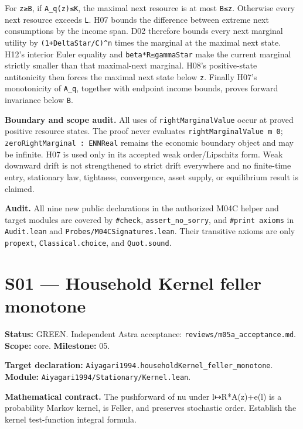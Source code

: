 \documentclass[
  11pt,
]{article}
\let\LedgerOriginalTexttt\texttt
\renewcommand{\texttt}[1]{{\small\LedgerOriginalTexttt{#1}}}
\begin{document}
For \texttt{z≥B}, if \texttt{A\_q(z)≤K}, the maximal next resource is at
most \texttt{B≤z}. Otherwise every next resource exceeds \texttt{L}. H07
bounds the difference between extreme next consumptions by the income
span. D02 therefore bounds every next marginal utility by
\texttt{(1+DeltaStar/C)\^{}n} times the marginal at the maximal next
state. H12's interior Euler equality and \texttt{beta*R≤gammaStar} make
the current marginal strictly smaller than that maximal-next marginal.
H08's positive-state antitonicity then forces the maximal next state
below \texttt{z}. Finally H07's monotonicity of \texttt{A\_q}, together
with endpoint income bounds, proves forward invariance below \texttt{B}.

\textbf{Boundary and scope audit.} All uses of
\texttt{rightMarginalValue} occur at proved positive resource states.
The proof never evaluates \texttt{rightMarginalValue\ m\ 0};
\texttt{zeroRightMarginal\ :\ ENNReal} remains the economic boundary
object and may be infinite. H07 is used only in its accepted weak
order/Lipschitz form. Weak downward drift is not strengthened to strict
drift everywhere and no finite-time entry, stationary law, tightness,
convergence, asset supply, or equilibrium result is claimed.

\textbf{Audit.} All nine new public declarations in the authorized M04C
helper and target modules are covered by \texttt{\#check},
\texttt{assert\_no\_sorry}, and \texttt{\#print\ axioms} in
\texttt{Audit.lean} and \texttt{Probes/M04CSignatures.lean}. Their
transitive axioms are only \texttt{propext}, \texttt{Classical.choice},
and \texttt{Quot.sound}.

\section{S01 --- Household Kernel feller
monotone}\label{s01-household-kernel-feller-monotone}

\textbf{Status:} GREEN. Independent Astra acceptance:
\texttt{reviews/m05a\_acceptance.md}. \textbf{Scope:} core.
\textbf{Milestone:} 05.

\textbf{Target declaration:}
\texttt{Aiyagari1994.householdKernel\_feller\_monotone}.\\
\textbf{Module:} \texttt{Aiyagari1994/Stationary/Kernel.lean}.

\textbf{Mathematical contract.} The pushforward of nu under
l↦R*A(z)+e(l) is a probability Markov kernel, is Feller, and preserves
stochastic order. Establish the kernel test-function integral formula.
\end{document}
